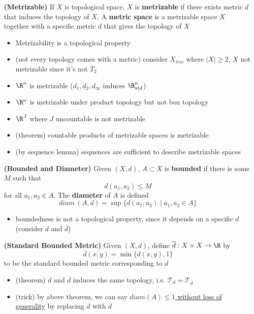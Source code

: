 \documentclass[10.5pt]{article}
\newcommand{\calT}{\mathcal{T}}
\begin{document}
\begin{defn*}
    \textbf{(Metrizable)} If $X$ is topological space, $X$ is \textbf{metrizable} if there exists metric $d$ that induces the topology of $X$. A \textbf{metric space} is a metrizable space $X$ together with a specific metric $d$ that gives the topology of $X$
    \begin{itemize}
        \item Metrizability is a topological property
        \item (not every topology comes with a metric) consider $X_{triv}$ where $|X|\geq 2$, $X$ not metrizable since it's not $T_2$
        \item $\R^n$ is metrizable ($d_1,d_2,d_{\infty}$ induces $\R^n_{std}$)
        \item $\R^{\omega}$ is metrizable under product topology but not box topology
        \item $\R^J$ where $J$ uncountable is not metrizable
        \item (theorem) countable products of metrizable spaces is metrizable
        \item (by sequence lemma) sequences are sufficient to describe metrizable spaces
    \end{itemize}
\end{defn*}


\begin{defn*}
    \textbf{(Bounded and Diameter)} Given $(X,d)$, $A\subset X$ is \textbf{bounded} if there is some $M$ such that
    \[
        d(a_1,a_2) \leq M    
    \]
    for all $a_1,a_2\in A$. The \textbf{diameter} of $A$ is defined
    \[
        diam\, (A, d) = \sup\{d(a_1,a_2) \mid a_1,a_2\in A\}    
    \]
    \begin{itemize}
        \item boundedness is not a topological property, since it depends on a specific $d$ (consider $d$ and $\overline{d}$)
    \end{itemize}
\end{defn*}

\begin{defn*}
    \textbf{(Standard Bounded Metric)} Given $(X,d)$, define $\overline{d}: X\times X\to \R$ by 
    \[
        \overline{d}(x,y) = \min \{ d(x,y), 1\}    
    \]
    to be the standard bounded metric corresponding to $d$
    \begin{itemize}
        \item (theorem) $d$ and $\overline{d}$ induces the same topology, i.e. $\calT_{d} = \calT_{\overline{d}}$
        \item (trick) by above theorem, we can say \underline{$diam(A) \leq 1$ without loss of generality} by replacing $d$ with $\overline{d}$
    \end{itemize}
\end{defn*}
\end{document}
